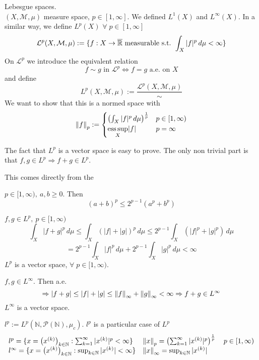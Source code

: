 Lebesgue spaces. \\
\((X, \mathcal{M}, \mu)\) measure space, \(p \in \left[1, \infty\right]\). We defined \(L^1(X)\) and \(L^\infty(X)\). 
In a similar way, we define \(L^p(X)\) \(\forall \; p \in \left[1, \infty\right]\)
\[
    \mathcal{L}^p (X, \mathcal{M}, \mu) := \{ f: X \rightarrow \overline{\mathbb{R}} \text{ measurable s.t. } \int_X |f|^p \, d\mu < \infty\}
\]
On \(\mathcal{L}^p\) we introduce the equivalent relation
\[
    f \sim g \text{ in } \mathcal{L}^p \iff f=g \text{ a.e. on } X 
\]
and define 
\[
    {L}^p (X, \mathcal{M}, \mu) := \frac{\mathcal{L}^p (X, \mathcal{M}, \mu)}{\sim}
\]
We want to show that this is a normed space with
\[
    \norm{f}_p := 
    \begin{cases}
        \left( \int_X |f|^p \, d\mu \right)^{\frac{1}{p}}  & p \in [1, \infty) \\
        \underset{X}{\text{ess}\, \text{sup}} |f| & p = \infty
    \end{cases}
\]

The fact that \(L^p\) is a vector space is easy to prove. The only non trivial part is that \(f, g \in L^p \Rightarrow f+g \in L^p\).

This comes directly from the 
\begin{lemma}
    \(p \in [1, \infty), \ a, b \geq 0\). Then 
    \[
        \left(a+b\right)^p \leq 2^{p-1} \left(a^p+b^p\right) 
    \]
\end{lemma}

\(f, g \in L^p, \ p \in [1, \infty)\)
\[
    \int_X |f+g|^p \, d\mu \leq \int_X (|f|+|g|)^p \, d\mu 
    \leq 2^{p-1} \int_X (|f|^p+|g|^p) \, d\mu
\]
\[
    = 2^{p-1} \int_X |f|^p \, d\mu + 2^{p-1} \int_X |g|^p \, d\mu < \infty
\]
\(L^p\) is a vector space, \(\forall \; p \in [1, \infty)\).


\(f, g \in L^\infty\). Then a.e. 
\[
    \Rightarrow |f+g| \leq |f|+|g| \leq \norm{f}_\infty + \norm{g}_\infty < \infty
    \Rightarrow f+g \in L^\infty
\]
\(L^\infty\) is a vector space. 

\begin{remark}
    \(l^p := L^p (\mathbb{N}, \mathcal{P}(\mathbb{N}), \mu_c )\). \(l^p\) is a particular case of \(L^p\)
    \[
    \begin{array}{ll}
        l^p = \{ x = \left(x^{(k)}\right)_{k \in \mathbb{N}} : \sum_{k=1}^\infty |x^{(k)}|^p < \infty \} 
        & \norm{x}_p = \left( \sum_{k=1}^\infty |x^{(k)}|^p \right)^{\frac{1}{p}} \quad p \in [1, \infty)
        \\ l^\infty = \{ x = \left(x^{(k)}\right)_{k \in \mathbb{N}} : \sup_{k \in \mathbb{N}} |x^{(k)}| < \infty \} 
        & \norm{x}_\infty = \sup_{k \in \mathbb{N}} |x^{(k)}|
    \end{array}
    \]
\end{remark}

